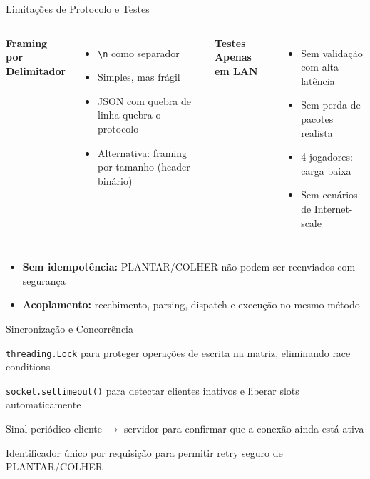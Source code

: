 \documentclass[aspectratio=169]{beamer}
\begin{document}
\begin{frame}{Limita\c{c}\~oes de Protocolo e Testes}
  \begin{columns}
    \textbf{Framing por Delimitador}
    \begin{itemize}
      \item \texttt{\textbackslash n} como separador
      \item Simples, mas fr\'agil
      \item JSON com quebra de linha quebra o protocolo
      \item Alternativa: framing por tamanho (header bin\'ario)
    \end{itemize}
    \textbf{Testes Apenas em LAN}
    \begin{itemize}
      \item Sem valida\c{c}\~ao com alta lat\^encia
      \item Sem perda de pacotes realista
      \item 4 jogadores: carga baixa
      \item Sem cen\'arios de Internet-scale
    \end{itemize}
  \end{columns}
  \vfill
  \begin{itemize}
    \item \textbf{Sem idempot\^encia:} PLANTAR/COLHER n\~ao podem ser reenviados com seguran\c{c}a
    \item \textbf{Acoplamento:} recebimento, parsing, dispatch e execu\c{c}\~ao no mesmo m\'etodo
  \end{itemize}
\end{frame}

\begin{frame}{Sincroniza\c{c}\~ao e Concorr\^encia}
  \begin{description}
    \item[Lock na Matriz:] \texttt{threading.Lock} para proteger opera\c{c}\~oes de escrita na matriz, eliminando race conditions
    \item[Timeout nos Sockets:] \texttt{socket.settimeout()} para detectar clientes inativos e liberar slots automaticamente
    \item[Heartbeat:] Sinal peri\'odico cliente $\rightarrow$ servidor para confirmar que a conex\~ao ainda est\'a ativa
    \item[Idempotency Keys:] Identificador \'unico por requisi\c{c}\~ao para permitir retry seguro de PLANTAR/COLHER
  \end{description}
\end{frame}
\end{document}
